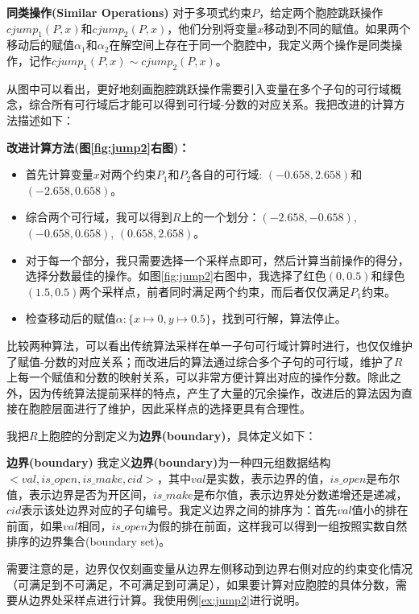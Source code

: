 \begin{example}
\begin{definition}{\textbf{同类操作(Similar Operations)}}
    对于多项式约束$P$，给定两个胞腔跳跃操作$cjump_1(P, x)$和$cjump_2(P, x)$，他们分别将变量$x$移动到不同的赋值。如果两个移动后的赋值$\alpha_1$和$\alpha_2$在解空间上存在于同一个胞腔中，我定义两个操作是同类操作，记作$cjump_1(P, x) \sim cjump_2(P, x)$。
\end{definition}
从图中可以看出，更好地刻画胞腔跳跃操作需要引入变量在多个子句的可行域概念，综合所有可行域后才能可以得到可行域-分数的对应关系。我把改进的计算方法描述如下：

\textbf{改进计算方法(图\ref{fig:jump2}右图)：}
\begin{itemize}
    \item 首先计算变量$x$对两个约束$P_1$和$P_2$各自的可行域: $(-0.658, 2.658)$和$(-2.658, 0.658)$。
    \item 综合两个可行域，我可以得到$R$上的一个划分：$(-2.658, -0.658)$, $(-0.658, 0.658)$, $(0.658, 2.658)$。
    \item 对于每一个部分，我只需要选择一个采样点即可，然后计算当前操作的得分，选择分数最佳的操作。如图\ref{fig:jump2}右图中，我选择了红色$(0, 0.5)$和绿色$(1.5, 0.5)$两个采样点，前者同时满足两个约束，而后者仅仅满足$P_1$约束。
    \item 检查移动后的赋值$\alpha: \{x \mapsto 0, y \mapsto 0.5\}$，找到可行解，算法停止。
\end{itemize}
比较两种算法，可以看出传统算法采样在单一子句可行域计算时进行，也仅仅维护了赋值-分数的对应关系；而改进后的算法通过综合多个子句的可行域，维护了$R$上每一个赋值和分数的映射关系，可以非常方便计算出对应的操作分数。除此之外，因为传统算法提前采样的特点，产生了大量的冗余操作，改进后的算法因为直接在胞腔层面进行了维护，因此采样点的选择更具有合理性。
\end{example}

我把$R$上胞腔的分割定义为\textbf{边界(boundary)}，具体定义如下：
\begin{definition}{\textbf{边界(boundary)}}
我定义\textbf{边界(boundary)}为一种四元组数据结构$<val, is\_open, is\_make, cid>$，其中$val$是实数，表示边界的值，$is\_open$是布尔值，表示边界是否为开区间，$is\_make$是布尔值，表示边界处分数递增还是递减，$cid$表示该处边界对应的子句编号。我定义边界之间的排序为：首先$val$值小的排在前面，如果$val$相同，$is\_open$为假的排在前面，这样我可以得到一组按照实数自然排序的边界集合(boundary set)。
\end{definition}
需要注意的是，边界仅仅刻画变量从边界左侧移动到边界右侧对应的约束变化情况（可满足到不可满足，不可满足到可满足），如果要计算对应胞腔的具体分数，需要从边界处采样点进行计算。我使用例\ref{ex:jump2}进行说明。

